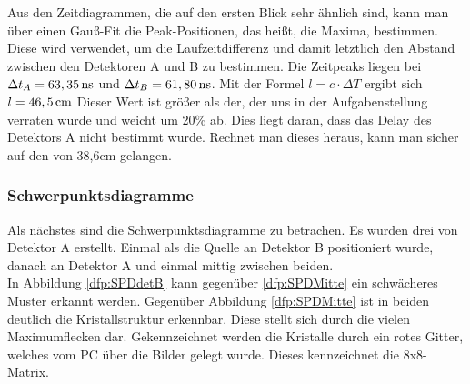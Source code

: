         \label{dft:kaliAB}
    Aus den Zeitdiagrammen, die auf den ersten Blick sehr ähnlich sind, kann man über einen Gauß-Fit die Peak-Positionen, das heißt, die Maxima, bestimmen.
    Diese wird verwendet, um die Laufzeitdifferenz und damit letztlich den Abstand zwischen den Detektoren A und B zu bestimmen.
    Die Zeitpeaks liegen bei $ \Delta t_A = \unit[63,35]{ns}$ und $\Delta t_B = \unit[61,80]{ns}$. Mit der Formel $l = c\cdot \Delta T$
    ergibt sich $l = \unit[46,5]{cm}$ Dieser Wert ist größer als der, der uns in der Aufgabenstellung verraten wurde und weicht um 20\% ab. Dies liegt daran, 
    dass das Delay des Detektors A nicht bestimmt wurde. Rechnet man dieses heraus, kann man sicher auf den von 38,6cm gelangen.

        
    \subsubsection{Schwerpunktsdiagramme}
    Als nächstes sind die Schwerpunktsdiagramme zu betrachen. Es wurden drei von Detektor A erstellt. Einmal als die Quelle an Detektor B positioniert wurde, danach an Detektor A und einmal mittig zwischen beiden.\\
    In Abbildung \ref{dfp:SPDdetB} kann gegenüber \ref{dfp:SPDMitte} ein schwächeres Muster erkannt werden. Gegenüber Abbildung \ref{dfp:SPDMitte} ist in beiden deutlich die Kristallstruktur erkennbar.
    Diese stellt sich durch die vielen Maximumflecken dar. Gekennzeichnet werden die Kristalle durch ein rotes Gitter, welches vom PC über die Bilder gelegt wurde. Dieses kennzeichnet die 8x8-Matrix.\\
        
